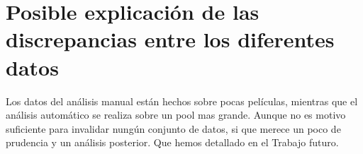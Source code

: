 \section{Posible explicación de las discrepancias entre los diferentes datos}
    Los datos del análisis manual están hechos sobre pocas películas, mientras que el análisis automático se realiza sobre un pool mas grande. Aunque no es motivo suficiente para invalidar nungún conjunto de datos, si que merece un poco de prudencia y un análisis posterior. Que hemos detallado en el Trabajo futuro.